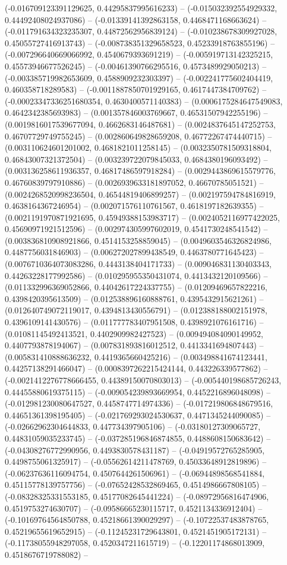 (-0.016709123391129625, 0.44295837995616233) -- (-0.015032392554929332, 0.44492408024937086) -- (-0.01339141392863158, 0.4468471168663624) -- (-0.011791634323235307, 0.44872562956839124) -- (-0.010238678309927028, 0.45055727416913743) -- (-0.008738351329658523, 0.45233918763855196) -- (-0.007296640669066992, 0.4540679393691219) -- (-0.005919713142325215, 0.45573946677526245) -- (-0.00461390766295516, 0.4573489929050213) -- (-0.003385719982653609, 0.4588909232303397) -- (-0.002241775602404419, 0.460358718289583) -- (-0.0011887850701929165, 0.4617447384709762) -- (-0.00023347336251680354, 0.4630400571140383) -- (0.0006175284647549083, 0.4642342385693983) -- (0.001357846003769667, 0.46531507942255196) -- (0.0019816017539677094, 0.4662683146487681) -- (0.0024837645147252753, 0.46707729749755245) -- (0.002860649828659208, 0.46772267474440715) -- (0.003110624601201002, 0.4681821011258145) -- (0.0032350781509318804, 0.46843007321372504) -- (0.003239722079845033, 0.4684380196093492) -- (0.003136258611936357, 0.46817486597918284) -- (0.0029443869615579776, 0.46760839797910886) -- (0.0026939633181897052, 0.46670785051521) -- (0.0024268520998236504, 0.46544819406899257) -- (0.002197594784816919, 0.4638164367246954) -- (0.002071576110761567, 0.4618197182639355) -- (0.0021191970871921695, 0.45949388153983717) -- (0.0024052116977422025, 0.45690971921512596) -- (0.002974305997602019, 0.4541730248541542) -- (0.003836810908921866, 0.4514153258859045) -- (0.0049603546326824986, 0.4487756031846903) -- (0.006272027899438549, 0.4463780771645423) -- (0.0076710364073083286, 0.4443138404171733) -- (0.009046831130403343, 0.44263228177992586) -- (0.010295955350431074, 0.4413432120109566) -- (0.011332996369052866, 0.44042617224337755) -- (0.01209469657822216, 0.4398420395613509) -- (0.012538896160888761, 0.4395432915621261) -- (0.012640749072119017, 0.4394813430556791) -- (0.012388188002151978, 0.4396109141430576) -- (0.011777783407951508, 0.4398921076161716) -- (0.01081145492413521, 0.4402909982427523) -- (0.009494084090149952, 0.4407793878194067) -- (0.007831893816012512, 0.4413341694807443) -- (0.005831410888636232, 0.4419365660425216) -- (0.003498841674123441, 0.44257138291466047) -- (0.0008397262215424144, 0.443226339577862) -- (-0.0021412276778666455, 0.44389150070803013) -- (-0.005440198685726243, 0.44455880619375115) -- (-0.009054239893669954, 0.4452216896048098) -- (-0.012981230080647527, 0.4458747714974336) -- (-0.017219806848679516, 0.44651361398195405) -- (-0.021769293024530637, 0.4471345244090085) -- (-0.02662962304644833, 0.447734397905106) -- (-0.03180127309065727, 0.44831059035233745) -- (-0.037285196846874855, 0.4488608150683642) -- (-0.04308276772990956, 0.4493830578431187) -- (-0.04919572765285905, 0.4498755061325917) -- (-0.05562614211478769, 0.45033648912819896) -- (-0.06237636116094754, 0.4507644261506961) -- (-0.06944898568541884, 0.45115778139757756) -- (-0.07652428532869465, 0.4514986667808105) -- (-0.08328325331553185, 0.45177082645441224) -- (-0.08972956816474906, 0.4519753274630707) -- (-0.09586665230115717, 0.4521134336912404) -- (-0.10169764564850788, 0.45218661390029297) -- (-0.10722537483878765, 0.45219655619652915) -- (-0.11245231729643801, 0.4521451905172131) -- (-0.11738055948297058, 0.4520347211615719) -- (-0.12201174868013909, 0.4518676719788082) -- 